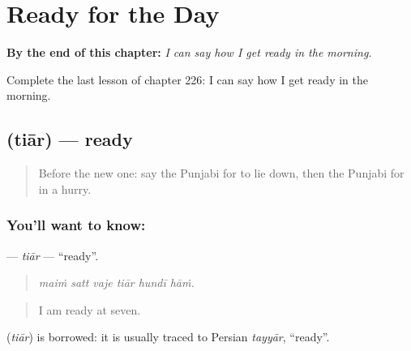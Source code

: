 
\chapter{Ready for the Day}
\label{ch:pa-a2-ready-for-the-day}

\begin{chapteropening}
\textbf{By the end of this chapter:} \emph{I can say how I get ready in the morning.}

Complete the last lesson of chapter 226: I can say how I get ready in the morning.
\end{chapteropening}

\section[\texorpdfstring{\pa{ਤਿਆਰ} (tiār)}{ਤਿਆਰ (tiār)}]{ (tiār) — ready}

\label{lesson:PA-C226-tiar}



\begin{quote}
Before the new one: say the Punjabi for to lie down, then the Punjabi for in a hurry.
\end{quote}

\subsection*{You'll want to know: }
\textbf{} — \emph{tiār} — \textquotedblleft{}ready\textquotedblright{}.

\begin{quote}
     
\end{quote}

\begin{quote}
\emph{maiṁ satt vaje tiār hundī hāṁ.}
\end{quote}

\begin{quote}
I am ready at seven.
\end{quote}

\begin{cousinweb}
\textbf{} (\emph{tiār}) is borrowed: it is usually traced to Persian \emph{tayyār}, \textquotedblleft{}ready\textquotedblright{}.
\end{cousinweb}

